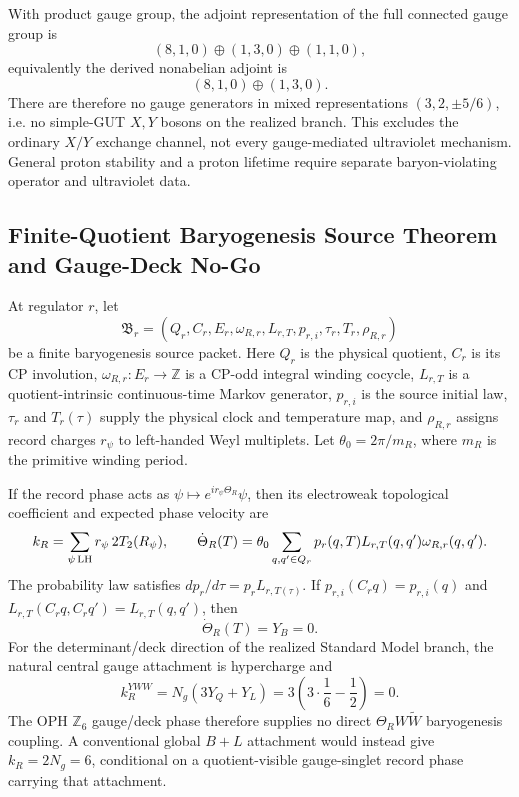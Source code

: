 \begin{corollary}
With product gauge group, the adjoint representation of the full connected gauge group is
\[
(8,1,0)\oplus(1,3,0)\oplus(1,1,0),
\]
equivalently the derived nonabelian adjoint is
\[
(8,1,0)\oplus(1,3,0).
\]
There are therefore no gauge generators in mixed representations
\((3,2,\pm5/6)\), i.e. no simple-GUT \(X,Y\) bosons on the realized branch.
This excludes the ordinary \(X/Y\) exchange channel, not every gauge-mediated
ultraviolet mechanism. General proton stability and a proton lifetime require
separate baryon-violating operator and ultraviolet data.
\end{corollary}

\subsection{Finite-Quotient Baryogenesis Source Theorem and Gauge-Deck No-Go}
\label{app:baryogenesis-source-theorem}

At regulator \(r\), let
\[
\mathfrak B_r=(Q_r,C_r,E_r,\omega_{R,r},L_{r,T},p_{r,i},
\tau_r,T_r,\rho_{R,r})
\]
be a finite baryogenesis source packet. Here \(Q_r\) is the physical quotient,
\(C_r\) is its CP involution, \(\omega_{R,r}:E_r\to\mathbb Z\) is a CP-odd
integral winding cocycle, \(L_{r,T}\) is a quotient-intrinsic continuous-time
Markov generator, \(p_{r,i}\) is the source initial law, \(\tau_r\) and
\(T_r(\tau)\) supply the physical clock and temperature map, and
\(\rho_{R,r}\) assigns record charges \(r_\psi\) to left-handed Weyl
multiplets. Let \(\theta_0=2\pi/m_R\), where \(m_R\) is the primitive winding
period.

\begin{theorem}
\label{thm:finite-baryogenesis-source}
If the record phase acts as
\(\psi\mapsto e^{ir_\psi\Theta_R}\psi\), then its electroweak topological
coefficient and expected phase velocity are
\[
k_R=\sum_{\psi\,{\rm LH}}r_\psi\,2T_2(R_\psi),
\qquad
\dot\Theta_R(T)=\theta_0
\sum_{q,q'\in Q_r}p_r(q,T)L_{r,T}(q,q')\omega_{R,r}(q,q').
\]
The probability law satisfies \(dp_r/d\tau=p_rL_{r,T(\tau)}\). If
\(p_{r,i}(C_rq)=p_{r,i}(q)\) and
\(L_{r,T}(C_rq,C_rq')=L_{r,T}(q,q')\), then
\[
\dot\Theta_R(T)=Y_B=0.
\]
For the determinant/deck direction of the realized Standard Model branch,
the natural central gauge attachment is hypercharge and
\[
k_R^{YWW}=N_g(3Y_Q+Y_L)
=3\left(3\cdot\frac16-\frac12\right)=0.
\]
The OPH \(\mathbb Z_6\) gauge/deck phase therefore supplies no direct
\(\Theta_R W\widetilde W\) baryogenesis coupling. A conventional global
\(B+L\) attachment would instead give \(k_R=2N_g=6\), conditional on a
quotient-visible gauge-singlet record phase carrying that attachment.
\end{theorem}


